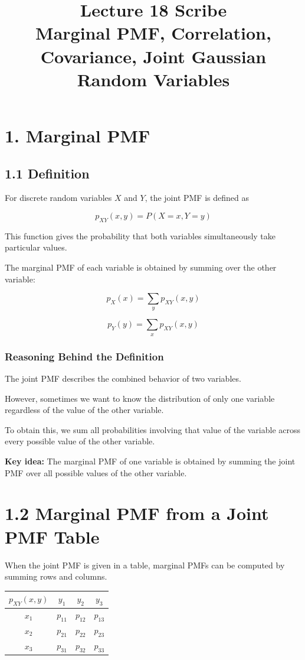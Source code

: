 \documentclass[12pt]{article}
\title{Lecture 18 Scribe\\
Marginal PMF, Correlation, Covariance, Joint Gaussian Random Variables}
\author{}
\date{}
\begin{document}
\maketitle

\section*{1. Marginal PMF}

\subsection*{1.1 Definition}

For discrete random variables $X$ and $Y$, the joint PMF is defined as

\[
p_{XY}(x,y) = P(X = x, Y = y)
\]

This function gives the probability that both variables simultaneously take particular values.

The marginal PMF of each variable is obtained by summing over the other variable:

\[
p_X(x) = \sum_y p_{XY}(x,y)
\]

\[
p_Y(y) = \sum_x p_{XY}(x,y)
\]

\subsubsection*{Reasoning Behind the Definition}

The joint PMF describes the combined behavior of two variables.

However, sometimes we want to know the distribution of only one variable regardless of the value of the other variable.

To obtain this, we sum all probabilities involving that value of the variable across every possible value of the other variable.

\textbf{Key idea:} The marginal PMF of one variable is obtained by summing the joint PMF over all possible values of the other variable.

\section*{1.2 Marginal PMF from a Joint PMF Table}

When the joint PMF is given in a table, marginal PMFs can be computed by summing rows and columns.

\begin{center}
\begin{tabular}{cccc}
\toprule
$p_{XY}(x,y)$ & $y_1$ & $y_2$ & $y_3$ \\
\midrule
$x_1$ & $p_{11}$ & $p_{12}$ & $p_{13}$ \\
$x_2$ & $p_{21}$ & $p_{22}$ & $p_{23}$ \\
$x_3$ & $p_{31}$ & $p_{32}$ & $p_{33}$ \\
\bottomrule
\end{tabular}
\end{center}
\end{document}
